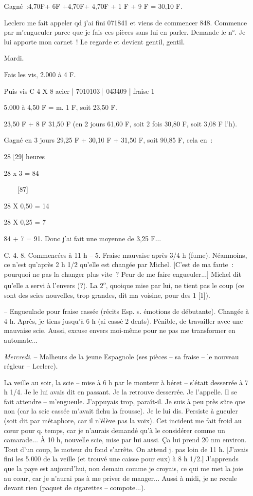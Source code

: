 \documentclass[french,twoside]{book} %
\begin{document}
Gagné :4,70F+ 6F +4,70F+ 4,70F + 1 F + 9 F = 30,10 F.\par
Leclerc me fait appeler qd j'ai fini 071841 et viens de commencer 848. Commence par m'engueuler parce que je fais ces pièces sans lui en parler. Demande le n°. Je lui apporte mon carnet ! Le regarde et devient gentil, gentil.\par
Mardi.\par
Fais les vis, 2.000 à 4 F.\par
Puis vis C 4 X 8 acier | 7010103 | 043409 | fraise 1\par
5.000 à 4,50 F = m. 1 F, soit 23,50 F.\par
23,50 F + 8 F 31,50 F (en 2 jours 61,60 F, soit 2 fois 30,80 F, soit 3,08 F l'h).\par
Gagné en 3 jours 29,25 F + 30,10 F + 31,50 F, soit 90,85 F, cela en :\par
28 [29] heures\par
28 x 3 = 84\par
[29]     [87]\par
28 X 0,50 = 14\par
28 X 0,25 = 7\par
84 + 7 = 91. Donc j'ai fait une moyenne de 3,25 F...\par
C. 4. 8. Commencées à 11 h – 5. Fraise mauvaise après 3/4 h (fume). Néanmoins, ce n'est qu'après 2 h 1/2 qu'elle est changée par Michel. [C'est de ma faute : pourquoi ne pas la changer plus vite ? Peur de me faire engueuler...] Michel dit qu'elle a servi à l'envers (?). La 2\textsuperscript{e}, quoique mise par lui, ne tient pas le coup (ce sont des scies nouvelles, trop grandes, dit ma voisine, pour des 1 [1]).\par
– Engueulade pour fraise cassée (récits Esp. s. émotions de débutante). Changée à 4 h. Après, je tiens jusqu'à 6 h (ai cassé 2 dents). Pénible, de travailler avec une mauvaise scie. Aussi, excuse envers moi-même pour ne pas me transformer en automate...\par
{\itshape Mercredi}. – Malheurs de la jeune Espagnole (ses pièces – sa fraise – le nouveau régleur – Leclerc).\par
La veille au soir, la scie – mise à 6 h par le monteur à béret – s'était desserrée à 7 h 1/4. Je le lui avais dit en passant. Je la retrouve desserrée. Je l'appelle. Il se fait attendre – m'engueule. J'appuyais trop, paraît-il. Je suis à peu près sûre que non (car la scie cassée m'avait fichu la frousse). Je le lui dis. Persiste à gueuler (soit dit par métaphore, car il n'élève pas la voix). Cet incident me fait froid au cœur pour q. temps, car je n'aurais demandé qu'à le considérer comme un camarade... À 10 h, nouvelle scie, mise par lui aussi. Ça lui prend 20 nm environ. Tout d'un coup, le moteur du fond s'arrête. On attend j. pas loin de 11 h. [J'avais fini les 5.000 de la veille (et trouvé une caisse pour eux) à 8 h 1/2.] J'apprends que la paye est aujourd'hui, non demain comme je croyais, ce qui me met la joie au cœur, car je n'aurai pas à me priver de manger... Aussi à midi, je ne recule devant rien (paquet de cigarettes – compote...).\par
\end{document}
